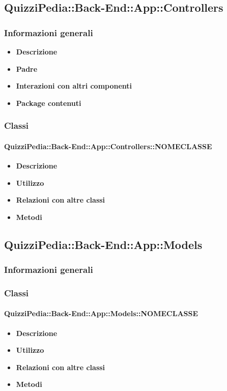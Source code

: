 \subsection{QuizziPedia::Back-End::App::Controllers}
\subsubsection{Informazioni generali}
	\begin{itemize}
		\item \textbf{Descrizione} \\
		\item \textbf{Padre} \\
		\item \textbf{Interazioni con altri componenti} \\
		\item \textbf{Package contenuti}
	\end{itemize}
\subsubsection{Classi}
\paragraph{QuizziPedia::Back-End::App::Controllers::NOMECLASSE}
	\begin{itemize}
		\item \textbf{Descrizione} \\
		\item \textbf{Utilizzo} \\
		\item \textbf{Relazioni con altre classi} \\
		\item \textbf{Metodi} \\
	\end{itemize}


\subsection{QuizziPedia::Back-End::App::Models}
\subsubsection{Informazioni generali}
\subsubsection{Classi}
\paragraph{QuizziPedia::Back-End::App::Models::NOMECLASSE}
\begin{itemize}
	\item \textbf{Descrizione} \\
	\item \textbf{Utilizzo} \\
	\item \textbf{Relazioni con altre classi} \\
	\item \textbf{Metodi} \\
\end{itemize}

